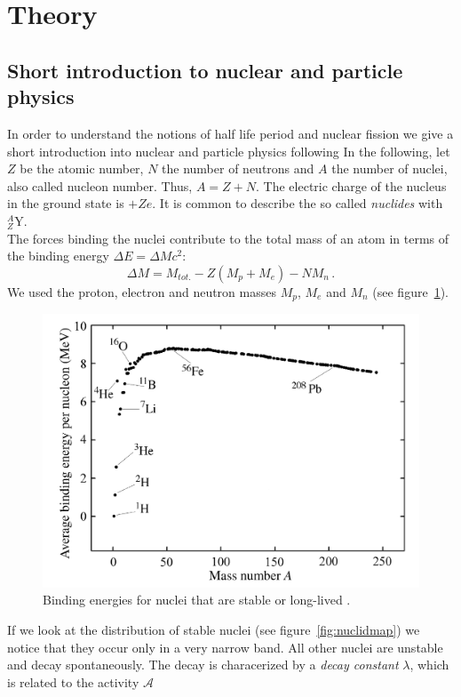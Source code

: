 \section{Theory}
\subsection{Short introduction to nuclear and particle physics}
In order to understand the notions of half life period and nuclear fission we
give a short introduction into nuclear and particle physics following \cite{martin2006nuclear}
In the following, let $Z$ be the atomic number, $N$ the number of neutrons and $A$ the number of nuclei, also
called nucleon number. Thus, $A = Z + N$. The electric charge of the nucleus in the ground state is $+Z e$.
It is common to describe the so called \emph{nuclides} with $_{Z}^{A}\textrm{Y}$.\\
The forces binding the nuclei contribute to the total mass of an atom in terms of the 
binding energy $\Delta E = \Delta M c^2$:
\begin{equation}
\Delta M = M_{tot.} - Z(M_p + M_e) - N M_n \, .
\end{equation}
We used the proton, electron and neutron masses $M_p$, $M_e$ and $M_n$ 
(see figure~\ref{fig:bindingenergy}).
\begin{figure}[htpb]
    \centering
    \includegraphics[width=0.8\linewidth]{figures/bindingenergy}
    \caption{Binding energies for nuclei that are stable or long-lived \cite{Hooshyar}.}
    \label{fig:bindingenergy}
\end{figure}
If we look at the distribution of stable nuclei (see figure~\ref{fig:nuclidmap}) we notice
that they occur only in a very narrow band. All other nuclei are unstable and decay spontaneously.
The decay is characerized by a \emph{decay constant} $\lambda$, which is related to the activity $\mathcal{A}$
